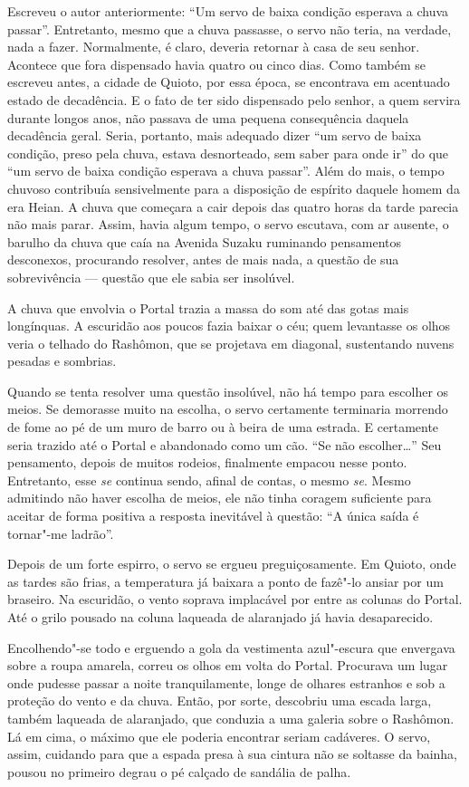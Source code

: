 Escreveu o autor anteriormente: ``Um servo de baixa condição esperava a
chuva passar''. Entretanto, mesmo que a chuva passasse, o servo não
teria, na verdade, nada a fazer. Normalmente, é claro, deveria retornar
à casa de seu senhor. Acontece que fora dispensado havia quatro ou
cinco dias. Como também se escreveu antes, a cidade de Quioto, por essa
época, se encontrava em acentuado estado de decadência. E o fato de ter
sido dispensado pelo senhor, a quem servira durante longos anos, não
passava de uma pequena consequência daquela decadência geral. Seria,
portanto, mais adequado dizer ``um servo de baixa condição, preso pela
chuva, estava desnorteado, sem saber para onde ir'' do que ``um servo de
baixa condição esperava a chuva passar''. Além do mais, o tempo chuvoso
contribuía sensivelmente para a disposição de espírito daquele homem da
era Heian. A chuva que começara a cair depois das quatro horas da tarde
parecia não mais parar. Assim, havia algum tempo, o servo escutava, com
ar ausente, o barulho da chuva que caía na Avenida Suzaku ruminando
pensamentos desconexos, procurando resolver, antes de mais nada, a
questão de sua sobrevivência --- questão que ele sabia ser insolúvel.

A chuva que envolvia o Portal trazia a massa do som até das gotas mais
longínquas. A escuridão aos poucos fazia baixar o céu; quem levantasse
os olhos veria o telhado do Rashômon, que se projetava em diagonal,
sustentando nuvens pesadas e sombrias.

Quando se tenta resolver uma questão insolúvel, não há tempo para
escolher os meios. Se demorasse muito na escolha, o servo certamente
terminaria morrendo de fome ao pé de um muro de barro ou à beira de uma
estrada. E certamente seria trazido até o Portal e abandonado como um
cão. ``Se não escolher\ldots{}'' Seu pensamento, depois de muitos rodeios,
finalmente empacou nesse ponto. Entretanto, esse \textit{se} continua sendo,
afinal de contas, o mesmo \textit{se}. Mesmo admitindo não haver escolha de
meios, ele não tinha coragem suficiente para aceitar de forma positiva
a resposta inevitável à questão: ``A única saída é tornar"-me ladrão''.

Depois de um forte espirro, o servo se ergueu preguiçosamente. Em
Quioto, onde as tardes são frias, a temperatura já baixara a ponto de
fazê"-lo ansiar por um braseiro. Na escuridão, o vento soprava
implacável por entre as colunas do Portal. Até o grilo pousado na
coluna laqueada de alaranjado já havia desaparecido.

Encolhendo"-se todo e erguendo a gola da vestimenta azul"-escura que
envergava sobre a roupa amarela, correu os olhos em volta do Portal.
Procurava um lugar onde pudesse passar a noite tranquilamente, longe de
olhares estranhos e sob a proteção do vento e da chuva. Então, por
sorte, descobriu uma escada larga, também laqueada de alaranjado, que
conduzia a uma galeria sobre o Rashômon. Lá em cima, o máximo que ele
poderia encontrar seriam cadáveres. O servo, assim, cuidando para que a
espada presa à sua cintura não se soltasse da bainha, pousou no
primeiro degrau o pé calçado de sandália de palha.


